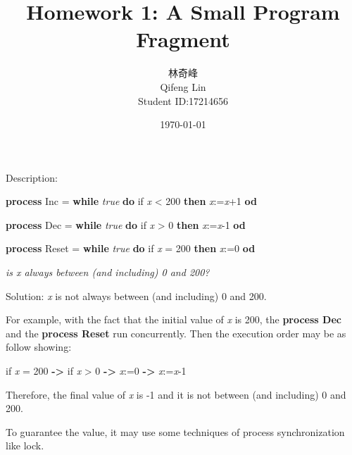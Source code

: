 \documentclass[11pt, a4paper]{article}
\begin{document}
    \title{Homework 1: A Small Program Fragment}
    \author{林奇峰\\
     Qifeng Lin\\
     Student ID:17214656 }
    \date{\today}
    \maketitle

\noindent Description:

    {\sffamily\bfseries process} Inc = {\sffamily\bfseries while} {\slshape true} {\sffamily\bfseries do} if {\slshape x} < 200 {\sffamily\bfseries then} {\slshape x}:={\slshape x}+1 {\sffamily\bfseries od}

    {\sffamily\bfseries process} Dec = {\sffamily\bfseries while} {\slshape true} {\sffamily\bfseries do} if {\slshape x} > 0 {\sffamily\bfseries then} {\slshape x}:={\slshape x}-1 {\sffamily\bfseries od}

    {\sffamily\bfseries process} Reset = {\sffamily\bfseries while} {\slshape true} {\sffamily\bfseries do} if {\slshape x} = 200 {\sffamily\bfseries then} {\slshape x}:=0 {\sffamily\bfseries od}

    \begin{flushright}
      {\slshape is x always between (and including) 0 and 200?}
    \end{flushright}

\noindent Solution:
    {\slshape x} is not always between (and including) 0 and 200.

    For example, with the fact that the initial value of {\slshape x} is 200, the {\sffamily\bfseries process Dec}  and the {\sffamily\bfseries process Reset}  run concurrently. Then the execution order may be as follow showing:

    if {\slshape x} = 200 {\sffamily\bfseries ->} if {\slshape x} > 0 {\sffamily\bfseries ->} {\slshape x}:=0  {\sffamily\bfseries ->} {\slshape x}:={\slshape x}-1

    Therefore, the final value of {\slshape x} is -1 and it is not between (and including) 0 and 200.
    
    To guarantee the value, it may use some techniques of process synchronization like lock.
\end{document}
